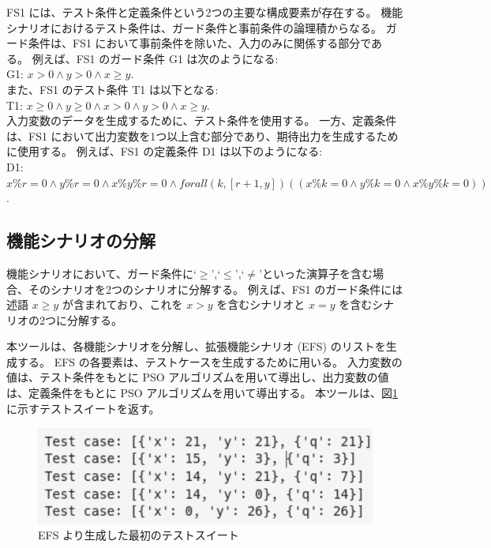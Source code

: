 \documentclass[uplatex, twocolumn, 10pt]{jsarticle} %
\begin{document}
FS1 には、テスト条件と定義条件という2つの主要な構成要素が存在する。
機能シナリオにおけるテスト条件は、ガード条件と事前条件の論理積からなる。
ガード条件は、FS1 において事前条件を除いた、入力のみに関係する部分である。
例えば、FS1 のガード条件 G1 は次のようになる:\\

G1: $x > 0 \land y > 0 \land x \geq y$.\\

また、FS1 のテスト条件 T1 は以下となる:\\

T1: $x \geq 0 \land y \geq 0 \land x > 0 \land y > 0 \land x \geq y$.\\

入力変数のデータを生成するために、テスト条件を使用する。
一方、定義条件は、FS1 において出力変数を1つ以上含む部分であり、期待出力を生成するために使用する。
例えば、FS1 の定義条件 D1 は以下のようになる:\\

D1: $x\%r = 0 \land y\%r = 0 \land x\%y\%r = 0 \land forall(k,[r+1,y])((x\%k = 0 \land y\%k = 0 \land x\%y\%k = 0))$.\\

\subsection{機能シナリオの分解}
機能シナリオにおいて、ガード条件に`$\geq$',`$\leq$',`$\neq$'といった演算子を含む場合、そのシナリオを2つのシナリオに分解する。
例えば、FS1 のガード条件には述語 $x \geq y$ が含まれており、これを $x > y$ を含むシナリオと $x = y$ を含むシナリオの2つに分解する。

本ツールは、各機能シナリオを分解し、拡張機能シナリオ (EFS) のリストを生成する。
EFS の各要素は、テストケースを生成するために用いる。
入力変数の値は、テスト条件をもとに PSO アルゴリズムを用いて導出し、出力変数の値は、定義条件をもとに PSO アルゴリズムを用いて導出する。
本ツールは、図\ref{fig:First_test_suite}に示すテストスイートを返す。

\begin{figure}[tp]
    \begin{center}
        \includegraphics[width=\linewidth]{../image/Automatic_Generation_of_Test/First_test_suite.png}
        \caption{EFS より生成した最初のテストスイート}
        \label{fig:First_test_suite}
    \end{center}
\end{figure}
\end{document}
